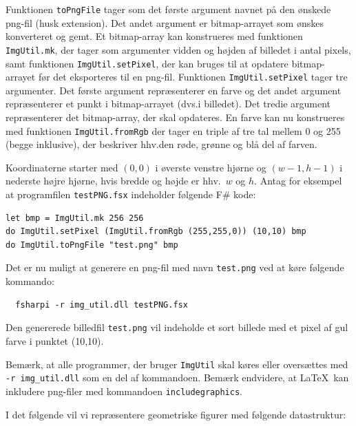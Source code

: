\documentclass[a4paper,12pt]{article}
\begin{document}
Funktionen \lstinline{toPngFile} tager som det første argument navnet
på den ønskede png-fil (husk extension).  Det andet argument er
bitmap-arrayet som ønskes konverteret og gemt. Et bitmap-array kan
konstrueres med funktionen \lstinline{ImgUtil.mk}, der tager som
argumenter vidden og højden af billedet i antal pixels, samt funktionen
\lstinline{ImgUtil.setPixel}, der kan bruges til at opdatere bitmap-arrayet
før det eksporteres til en png-fil. Funktionen \lstinline{ImgUtil.setPixel}
tager tre argumenter. Det første argument repræsenterer en farve og
det andet argument repræsenterer et punkt i bitmap-arrayet (dvs.\@ i
billedet). Det tredie argument repræsenterer det bitmap-array, der
skal opdateres.  En farve kan nu konstrueres med funktionen
\lstinline{ImgUtil.fromRgb} der tager en triple af tre tal mellem 0 og
255 (begge inklusive), der beskriver hhv.\@ den røde, grønne og blå del
af farven.

Koordinaterne starter med $(0,0)$ i øverste venstre hjørne og
$(w-1,h-1)$ i nederste højre hjørne, hvis bredde og højde er hhv.\ $w$
og $h$.  Antag for eksempel at programfilen \texttt{testPNG.fsx}
indeholder følgende F\# kode:

\begin{lstlisting}[numbers=none,frame=none,mathescape]
let bmp = ImgUtil.mk 256 256
do ImgUtil.setPixel (ImgUtil.fromRgb (255,255,0)) (10,10) bmp
do ImgUtil.toPngFile "test.png" bmp
\end{lstlisting}

\noindent
Det er nu muligt at generere en png-fil med navn \texttt{test.png} ved
at køre følgende kommando:

  \vspace{-4mm}
\begin{verbatim}
  fsharpi -r img_util.dll testPNG.fsx
\end{verbatim}
  \vspace{-4mm}

\noindent
Den genererede billedfil \texttt{test.png} vil indeholde
et sort billede med et pixel af gul farve i punktet (10,10).

\noindent
Bemærk, at alle programmer, der bruger \texttt{ImgUtil} skal køres
eller oversættes med \texttt{-r img\_util.dll} som en del af
kommandoen.
%
Bemærk endvidere, at \LaTeX\ kan inkludere png-filer med
kommandoen \texttt{includegraphics}.

\vspace{2ex}

\noindent
I det følgende vil vi repræsentere geometriske figurer med følgende
datastruktur:
\end{document}

